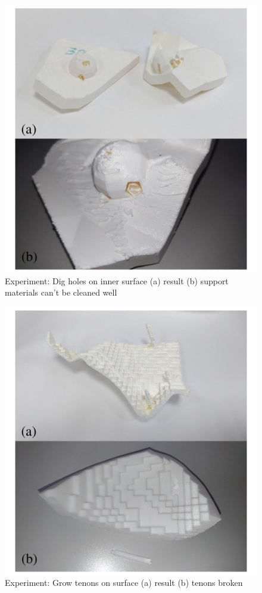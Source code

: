 \begin{figure}[ht]
\centering
\includegraphics[width=1.0\linewidth]{figs/dig_hole.pdf} 
\caption{Experiment: Dig holes on inner surface (a) result (b)  support materials can't be cleaned well}
\label{fig:exp_surface_dig}
\end{figure}

\begin{figure}[ht]
\centering
\includegraphics[width=1.0\linewidth]{figs/grow_tenon.pdf} 
\caption{Experiment: Grow tenons on surface (a) result (b) tenons broken}
\label{fig:exp_surface_tenon}
\end{figure}

